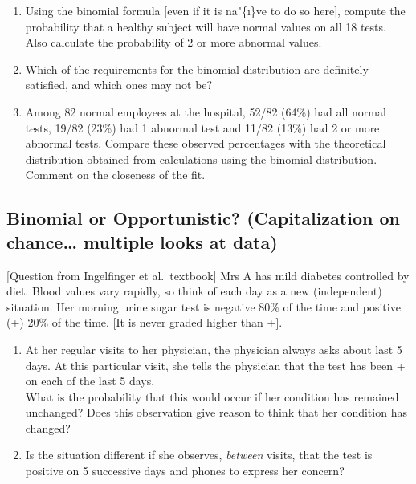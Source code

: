 \documentclass[]{book}
\providecommand{\tightlist}{%
  \setlength{\itemsep}{0pt}\setlength{\parskip}{0pt}}
\begin{document}
\begin{enumerate}
\def\labelenumi{\arabic{enumi}.}
\tightlist
\item
  Using the binomial formula {[}even if it is na"\{\i\}ve to do so here{]}, compute the probability that a healthy subject will have normal values on all 18 tests. Also calculate the probability of 2 or more abnormal values.
\item
  Which of the requirements for the binomial distribution are definitely satisfied, and which ones may not be?
\item
  Among 82 normal employees at the hospital, 52/82 (64\%) had all normal tests, 19/82 (23\%) had 1 abnormal test and 11/82 (13\%) had 2 or more abnormal tests. Compare these observed percentages with the theoretical distribution obtained from calculations using the binomial distribution. Comment on the closeness of the fit.
\end{enumerate}

\hypertarget{binomial-or-opportunistic-capitalization-on-chance-multiple-looks-at-data}{%
\subsection{Binomial or Opportunistic? (Capitalization on chance\ldots{} multiple looks at data)}\label{binomial-or-opportunistic-capitalization-on-chance-multiple-looks-at-data}}

{[}Question from Ingelfinger et al.~textbook{]} Mrs A has mild diabetes controlled by diet. Blood values vary rapidly, so think of each day as a new (independent) situation.
Her morning urine sugar test is negative 80\% of the time and positive (+) 20\% of the time. {[}It is never graded higher than +{]}.

\begin{enumerate}
\def\labelenumi{\arabic{enumi}.}
\item
  At her regular visits to her physician, the physician always asks about last 5 days. At this particular visit, she tells the physician that the test has been + on each of the last 5 days.\\
  What is the probability that this would occur if her condition has remained unchanged? Does this observation give reason to think that her condition has changed?
\item
  Is the situation different if she observes, \emph{between} visits, that the test is positive on 5 successive days and phones to express her concern?
\end{enumerate}
\end{document}
